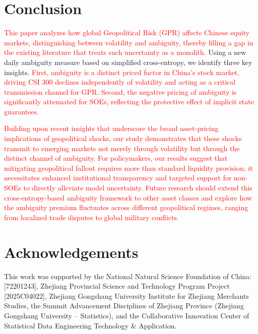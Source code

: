 \documentclass[preprint,12pt,authoryear]{elsarticle}
\begin{document}
\section{Conclusion}
\label{sec:conclusion}


\textcolor{red}{This paper analyzes how global Geopolitical Risk (GPR) affects Chinese equity markets, distinguishing between volatility and ambiguity, thereby filling a gap in the existing literature that treats such uncertainty as a monolith.} Using a new daily ambiguity measure based on simplified cross-entropy, we identify three key insights. \textcolor{red}{First, ambiguity is a distinct priced factor in China's stock market, driving CSI 300 declines independently of volatility and acting as a critical transmission channel for GPR. Second, the negative pricing of ambiguity is significantly attenuated for SOEs, reflecting the protective effect of implicit state guarantees.}

\textcolor{red}{Building upon recent insights that underscore the broad asset-pricing implications of geopolitical shocks, our study demonstrates that these shocks transmit to emerging markets not merely through volatility but through the distinct channel of ambiguity. For policymakers, our results suggest that mitigating geopolitical fallout requires more than standard liquidity provision; it necessitates enhanced institutional transparency and targeted support for non-SOEs to directly alleviate model uncertainty. Future research should extend this cross-entropy-based ambiguity framework to other asset classes and explore how the ambiguity premium fluctuates across different geopolitical regimes, ranging from localized trade disputes to global military conflicts.}




\clearpage
\section*{Acknowledgements}
This work was supported by the National Natural Science Foundation of China: [72201243], Zhejiang Provincial Science and Technology Program Project [2025C04022], Zhejiang Gongshang University Institute for Zhejiang Merchants Studies, the Summit Advancement Disciplines of Zhejiang Province (Zhejiang Gongshang University -- Statistics), and the Collaborative Innovation Center of Statistical Data Engineering Technology \& Application.
\end{document}
